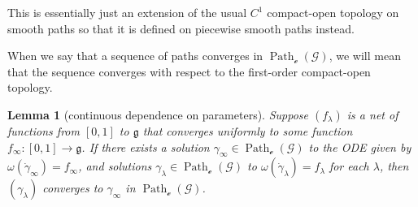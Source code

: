 \documentclass[pdftex]{sigma}
\numberwithin{equation}{section}
\newtheorem{Lemma}[Theorem]{Lemma}
\theoremstyle{definition}
\DeclareMathOperator{\Path}{Path}
\begin{document}
This is essentially just an extension of the usual $C^1$ compact-open topology on smooth paths so that it is defined on piecewise smooth paths instead.

When we say that a sequence of paths converges in $\Path_\mathscr{e}(\mathscr{G})$, we will mean that the sequence converges with respect to the first-order compact-open topology.

\begin{Lemma}[continuous dependence on parameters]\label{cdop} Suppose $(f_\lambda)$ is a net of functions from $[0,1]$ to $\mathfrak{g}$ that converges uniformly to some function $f_\infty\colon [0,1]\to\mathfrak{g}$. If there exists a solution $\gamma_\infty\in\Path_\mathscr{e}(\mathscr{G})$ to the ODE given by $\omega(\dot{\gamma}_\infty)=f_\infty$, and solutions $\gamma_\lambda\in\Path_\mathscr{e}(\mathscr{G})$ to $\omega(\dot{\gamma}_\lambda)=f_\lambda$ for each $\lambda$, then $(\gamma_\lambda)$ converges to $\gamma_\infty$ in $\Path_\mathscr{e}(\mathscr{G})$.\end{Lemma}
\end{document}
